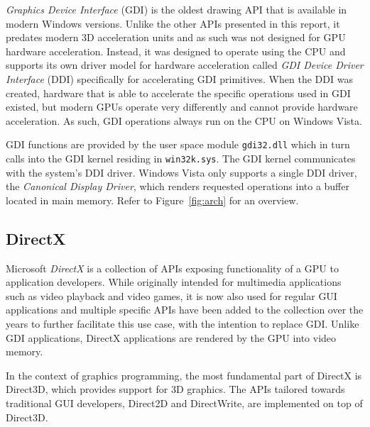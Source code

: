 		 \label{sec:gdi}
			\textit{Graphics Device Interface} (GDI) is the oldest drawing API
			that is available in modern Windows versions. Unlike the other
			APIs presented in this report,
			it predates modern 3D acceleration units and as such
			was not designed for GPU hardware acceleration. Instead, it was
			designed to operate using the CPU and supports its own driver model
			for hardware acceleration called \textit{GDI Device Driver
			Interface} (DDI) specifically for accelerating GDI
			primitives. When the DDI was created, hardware that is able to
			accelerate the specific operations used in GDI existed, but modern GPUs operate
			very differently and cannot provide hardware acceleration. As such,
			GDI operations always run on the CPU on Windows Vista. \cite{d2dvsgdi}

			GDI functions are provided by the user space module
			\texttt{gdi32.dll} which in turn calls into the GDI kernel residing
			in \texttt{win32k.sys}. The GDI kernel communicates with the
			system's DDI driver. Windows Vista only supports a single DDI driver,
			the \textit{Canonical Display Driver}, which renders requested operations
			into a buffer located in main memory. Refer to Figure~\ref{fig:arch}
			for an overview. \cite{d2dvsgdi, dwmredirect}

		\subsection{DirectX}
			Microsoft \textit{DirectX} is a collection of APIs exposing functionality of
			a GPU to application developers. While originally intended for
			multimedia applications such as video playback and video games, it
			is now also used for regular GUI applications and multiple specific
			APIs have been added to the collection over the years to further
			facilitate this use case, with the intention to replace GDI.
			Unlike GDI applications, DirectX applications
			are rendered by the GPU into video memory. \cite{d2dvsgdi,aboutd2d}

			In the context of graphics programming, the most fundamental part of
			DirectX is Direct3D, which provides support for 3D graphics. The
			APIs tailored towards traditional GUI developers, Direct2D and
			DirectWrite, are implemented on top of Direct3D. \cite{aboutd2d}

